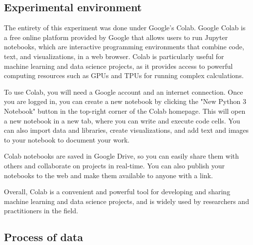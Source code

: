 \documentclass[sigconf]{acmart}
\begin{document}
{\subsection{Experimental environment}
The entirety of this experiment was done under Google's Colab. Google Colab is a free online platform provided by Google that allows users to run Jupyter notebooks, which are interactive programming environments that combine code, text, and visualizations, in a web browser. Colab is particularly useful for machine learning and data science projects, as it provides access to powerful computing resources such as GPUs and TPUs for running complex calculations.

To use Colab, you will need a Google account and an internet connection. Once you are logged in, you can create a new notebook by clicking the "New Python 3 Notebook" button in the top-right corner of the Colab homepage. This will open a new notebook in a new tab, where you can write and execute code cells. You can also import data and libraries, create visualizations, and add text and images to your notebook to document your work.

Colab notebooks are saved in Google Drive, so you can easily share them with others and collaborate on projects in real-time. You can also publish your notebooks to the web and make them available to anyone with a link.

Overall, Colab is a convenient and powerful tool for developing and sharing machine learning and data science projects, and is widely used by researchers and practitioners in the field.

\subsection{Process of data}

}
\end{document}
